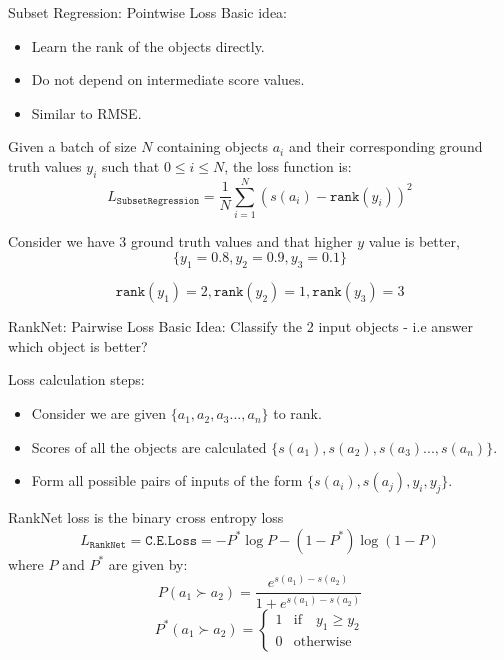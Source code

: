 \documentclass{beamer}
\begin{document}
\begin{frame}[t]{Subset Regression: Pointwise Loss}
Basic idea:~\cite{subsetregressionpaper}
\begin{itemize}
\item Learn the rank of the objects directly.
\item Do not depend on intermediate score values.
\item Similar to RMSE.
\end{itemize}

Given a batch of size $N$ containing objects $a_i$ and their corresponding ground truth values $y_i$ such that $0 \leq i \leq N$,  the loss function is:
$$
L_{\texttt{SubsetRegression}} = \frac{1}{N} \sum\limits_{i=1}^{N} (s(a_i) - \texttt{rank}(y_i))^2
$$

Consider we have 3 ground truth values and that higher $y$ value is better, 
$$
\{y_1 = 0.8, y_2 = 0.9, y_3 = 0.1\}
$$

$$
\texttt{rank}(y_1) = 2,  \texttt{rank}(y_2) = 1,  \texttt{rank}(y_3) = 3
$$

\end{frame}

\begin{frame}[t]{RankNet: Pairwise Loss}
Basic Idea: Classify the 2 input objects - i.e answer which object is better?~\cite{ranknetpaper}

Loss calculation steps:
\begin{itemize}
\item Consider we are given $\{a_1, a_2, a_3..., a_n\}$ to rank.
\item Scores of all the objects are calculated $\{s(a_1), s(a_2), s(a_3)..., s(a_n)\}$.
\item Form all possible pairs of inputs of the form $\{s(a_i), s(a_j), y_i, y_j\}$.
\end{itemize}

RankNet loss is the binary cross entropy loss
$$
L_{\texttt{RankNet}} = \texttt{C.E.Loss} = -P^*\log P - (1 - P^*)\log(1-P)
$$
where $P$ and $P^*$ are given by:
$$
P(a_1 \succ a_2) = \frac{e^{s(a_1) - s(a_2)}}{1 + e^{s(a_1) - s(a_2)} }
$$
$$
P^*(a_1 \succ a_2) =
\begin{cases}
      1 & \text{if} \quad y_1 \geq y_2 \\
      0 &  \text{otherwise}
\end{cases}       
$$

\end{frame}
\end{document}
